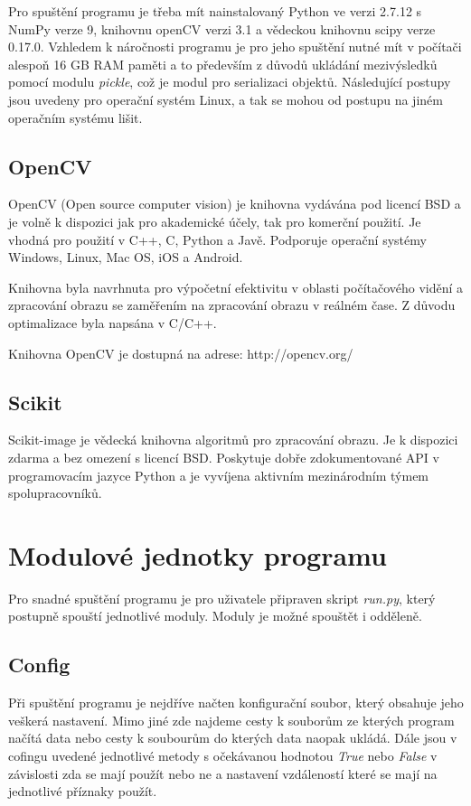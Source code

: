 \documentclass[czech,BP]{thesiskiv}
\begin{document}
\par Pro spuštění programu je třeba mít nainstalovaný Python ve verzi 2.7.12 s NumPy verze 9, knihovnu openCV verzi 3.1 a vědeckou knihovnu scipy verze 0.17.0. Vzhledem k náročnosti programu je pro jeho spuštění nutné mít v počítači alespoň 16 GB RAM paměti a to především z důvodů ukládání mezivýsledků pomocí modulu \textit{pickle}, což je modul pro serializaci objektů. Následující postupy jsou uvedeny pro operační systém Linux, a tak se mohou od postupu na jiném operačním systému lišit.   
  
  
\subsection{OpenCV}
\par OpenCV (Open source computer vision) je knihovna vydávána pod licencí BSD a je volně k dispozici jak pro akademické účely, tak pro komerční použití. Je vhodná pro použití v C++, C, Python a Javě. Podporuje operační systémy Windows, Linux, Mac OS, iOS a Android.

\par Knihovna byla navrhnuta pro výpočetní efektivitu v oblasti počítačového vidění a zpracování obrazu se zaměřením na zpracování obrazu v reálném čase. Z důvodu optimalizace byla napsána v C/C++. 

\par Knihovna OpenCV je dostupná na adrese: http://opencv.org/

\subsection{Scikit}
\par Scikit-image je vědecká knihovna algoritmů pro zpracování obrazu. Je k dispozici zdarma a bez omezení s licencí BSD. Poskytuje dobře zdokumentované API v programovacím jazyce Python a je vyvíjena aktivním mezinárodním týmem spolupracovníků.
\cite{Scikit}

\section{Modulové jednotky programu}
Pro snadné spuštění programu je pro uživatele připraven skript \textit{run.py}, který postupně spouští jednotlivé moduly. Moduly je možné spouštět i odděleně.
\subsection{Config}
\par Při spuštění programu je nejdříve načten konfigurační soubor, který obsahuje jeho veškerá nastavení. Mimo jiné zde najdeme cesty k souborům ze kterých program načítá data nebo cesty k soubourům do kterých data naopak ukládá. Dále jsou v cofingu uvedené jednotlivé metody s očekávanou hodnotou \textit{True} nebo \textit{False} v závislosti zda se mají použít nebo ne a nastavení vzdáleností které se mají na jednotlivé příznaky použít.
\end{document}
